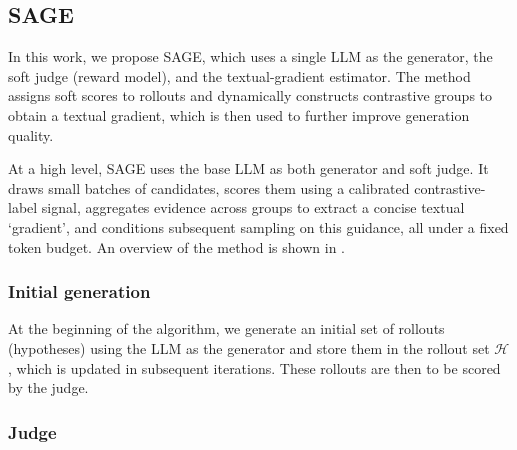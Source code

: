 \documentclass{article}
\theoremstyle{plain}
\theoremstyle{definition}
\theoremstyle{remark}
\newcommand{\method}{SAGE} %
\begin{document}
\subsection{SAGE}\label{method}
In this work, we propose \method{}, which uses a single LLM as the generator, the soft judge (reward model), and the textual-gradient estimator. The method assigns soft scores to rollouts and dynamically constructs contrastive groups to obtain a textual gradient, which is then used to further improve generation quality.

At a high level, \method{} uses the base LLM as both generator and soft judge. It draws small batches of candidates, scores them using a calibrated contrastive-label signal, aggregates evidence across groups to extract a concise textual `gradient', and conditions subsequent sampling on this guidance, all under a fixed token budget. An overview of the method is shown in .

\subsubsection{Initial generation}
At the beginning of the algorithm, we generate an initial set of rollouts (hypotheses) using the LLM as the generator and store them in the rollout set $\mathcal{H}$, which is updated in subsequent iterations. These rollouts are then to be scored by the judge.


\subsubsection{Judge}
\end{document}
